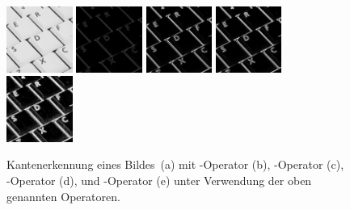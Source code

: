 \begin{figure}[H]
  \label{ref:edge-detection}
  \centering
  \includegraphics[width=0.1925\textwidth]{img/basics/edge-detection/original}
  \includegraphics[width=0.1925\textwidth]{img/basics/edge-detection/roberts}
  \includegraphics[width=0.1925\textwidth]{img/basics/edge-detection/prewitt}
  \includegraphics[width=0.1925\textwidth]{img/basics/edge-detection/sobel}
  \includegraphics[width=0.1925\textwidth]{img/basics/edge-detection/scharr}
  \caption[Kantenerkennung]{Kantenerkennung eines Bildes\protect\footnotemark~(a) mit -Operator (b), -Operator (c), -Operator (d), und -Operator (e) unter Verwendung der oben genannten Operatoren.}
\end{figure}

